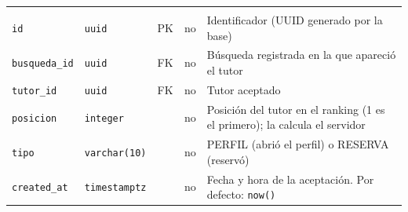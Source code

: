 {\small
\begin{xltabular}{\textwidth}{@{}>{\raggedright\arraybackslash}p{3.6cm} >{\raggedright\arraybackslash}p{2.3cm} >{\raggedright\arraybackslash}p{1cm} >{\centering\arraybackslash}p{0.85cm} L@{}}
    \toprule
     &  &  &  &  \\
    \midrule
    \endfirsthead
    \toprule
     &  &  &  &  \\
    \midrule
    \endhead
    \bottomrule
    \endfoot
    \texttt{id} & \texttt{uuid} & PK & no & Identificador (UUID generado por la base) \\
    \texttt{busqueda\_\allowbreak{}id} & \texttt{uuid} & FK & no & Búsqueda registrada en la que apareció el tutor \\
    \texttt{tutor\_\allowbreak{}id} & \texttt{uuid} & FK & no & Tutor aceptado \\
    \texttt{posicion} & \texttt{integer} &  & no & Posición del tutor en el ranking (1 es el primero); la calcula el servidor \\
    \texttt{tipo} & \texttt{varchar(\allowbreak{}10)} &  & no & PERFIL (abrió el perfil) o RESERVA (reservó) \\
    \texttt{created\_\allowbreak{}at} & \texttt{timestamptz} &  & no & Fecha y hora de la aceptación. Por defecto: \texttt{now(\allowbreak{})} \\
\end{xltabular}
}

